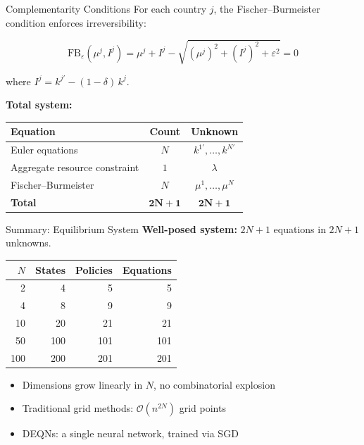 \documentclass[aspectratio=169,11pt]{beamer}
\newcommand{\emphc}[1]{\textcolor{harvardcrimson}{#1}}
\begin{document}
\begin{frame}{Complementarity Conditions}
For each country $j$, the Fischer--Burmeister condition enforces irreversibility:

\[
\text{FB}_{\varepsilon}(\mu^j, I^j)
= \mu^j + I^j - \sqrt{(\mu^j)^2 + (I^j)^2 + \varepsilon^2} = 0
\]

where $I^j = k^{j\prime} - (1-\delta)\,k^j$.

\vspace{0.5em}
\textbf{Total system:}
\begin{center}
\begin{tabular}{lcc}
\toprule
\textbf{Equation} & \textbf{Count} & \textbf{Unknown} \\
\midrule
Euler equations & $N$ & $k^{1\prime}, \ldots, k^{N\prime}$ \\
Aggregate resource constraint & $1$ & $\lambda$ \\
Fischer--Burmeister & $N$ & $\mu^1, \ldots, \mu^N$ \\
\midrule
\textbf{Total} & $\bm{2N+1}$ & $\bm{2N+1}$ \\
\bottomrule
\end{tabular}
\end{center}
\end{frame}

\begin{frame}{Summary: Equilibrium System}
\textbf{Well-posed system:} $2N+1$ equations in $2N+1$ unknowns.

\vspace{0.5em}
\begin{center}
\begin{tabular}{rrrr}
\toprule
$N$ & \textbf{States} & \textbf{Policies} & \textbf{Equations} \\
\midrule
2 & 4 & 5 & 5 \\
4 & 8 & 9 & 9 \\
10 & 20 & 21 & 21 \\
50 & 100 & 101 & 101 \\
100 & 200 & 201 & 201 \\
\bottomrule
\end{tabular}
\end{center}

\vspace{0.3em}
\begin{itemize}
    \item Dimensions grow \emphc{linearly} in $N$, no combinatorial explosion
    \item Traditional grid methods: $\mathcal{O}(n^{2N})$ grid points
    \item DEQNs: a single neural network, trained via SGD
\end{itemize}
\end{frame}
\end{document}
